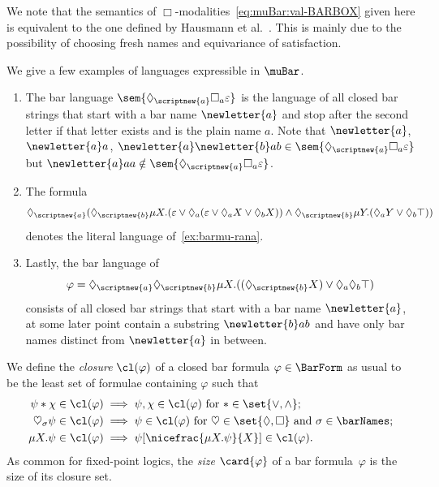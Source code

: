 \documentclass[10pt, final, conference, a4paper, twocolumn]{IEEEtran}
\begin{document}
\begin{rem} \label{rem:sem-equivalence}
  We note that the semantics of
  $\Box$-modalities~\eqref{eq:muBar:val-BARBOX} given here is equivalent to the one 
  defined by Hausmann et al.~\cite{hms21}. This is mainly due to the possibility of choosing
  fresh names and equivariance of satisfaction.
\end{rem}

\removeThmBraces
\begin{example} \label{ex:barmutls}
  We give a few examples of languages expressible in $\muBar$. 
  \begin{enumerate}
    \item The bar language $\sem{\Diamond_{\scriptnew{a}}\Box_a\varepsilon}$ is the language of all closed bar strings that
      start with a bar name $\newletter{a}$ and stop after the second letter if that letter exists and is the plain name $a$. Note that $\newletter{a}$, $\newletter{a}a$, $\newletter{a}\newletter{b}ab \in \sem{\Diamond_{\scriptnew{a}}\Box_a\varepsilon}$ but $\newletter{a}aa \notin \sem{\Diamond_{\scriptnew{a}}\Box_a\varepsilon}$.
    \item The formula
      \[\Diamond_{\scriptnew{a}}(\Diamond_{\scriptnew{b}}\mu X.(\varepsilon \vee \Diamond_a(\varepsilon \vee \Diamond_a X \vee \Diamond_b X)) \wedge \Diamond_{\scriptnew{b}}\mu Y.(\Diamond_a Y \vee \Diamond_b \top))\]
      denotes the literal language of~\cref{ex:barmu-rana}.
    \item\label{ex:barmutls:3} Lastly, the bar language of \[\varphi = \Diamond_{\scriptnew{a}}\Diamond_{\scriptnew{b}}\mu X. ((\Diamond_{\scriptnew{b}}X) \vee \Diamond_a\Diamond_b\top)\]
      consists of all closed bar strings that start with a bar name $\newletter{a}$, at some later point contain a
      substring $\newletter{b}ab$ and have only bar names distinct from $\newletter{a}$ in between.
  \end{enumerate}
\end{example}
\resetCurThmBraces


\begin{defn}
  We define the \emph{closure} $\cl(\varphi)$ of a closed bar formula $\varphi \in
  \BarForm$ as usual to be the least
  set of formulae containing $\varphi$ such that
  \begin{align*}
    \psi \ast \chi \in \cl(\varphi) &\text{${}\implies \psi, \chi \in \cl(\varphi)$ for $\ast \in \set{\vee, \wedge}$};\\
    \heartsuit_\sigma \psi \in \cl(\varphi) &{}\implies \psi \in \cl(\varphi)\ \text{for $\heartsuit \in  \set{\Diamond, \Box}$ and $\sigma \in \barNames$};\\
    \mu X. \psi \in \cl(\varphi) &{}\implies \psi[\nicefrac{\mu X.\psi}{X}] \in \cl(\varphi).  
  \end{align*}
  As common for fixed-point logics, the \emph{size} $\card{\varphi}$ of a bar formula~$\varphi$ is the size of its closure set.
\end{defn}
\end{document}

